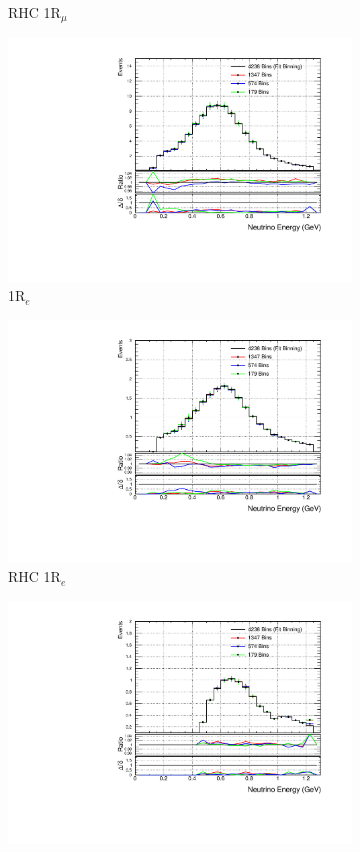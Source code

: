\begin{figure}[!ht]
\begin{subfigure}{.49\textwidth}
  \caption{RHC 1R$_{\mu}$}
\end{subfigure}
\begin{subfigure}{.49\textwidth}
  \centering
  \includegraphics[width=0.95\linewidth]{figs/detbin_nue}
  \caption{1R$_{e}$}
\end{subfigure}
\begin{subfigure}{.49\textwidth}
  \centering
  \includegraphics[width=0.95\linewidth]{figs/detbin_nuebar}
  \caption{RHC 1R$_{e}$}
\end{subfigure}
\begin{subfigure}{.49\textwidth}
  \centering
  \includegraphics[width=0.95\linewidth]{figs/detbin_nue1pi}

\end{subfigure}
\end{figure}
